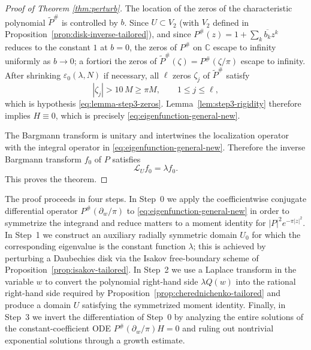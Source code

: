 \documentclass[a4paper,11pt,reqno]{amsart}
\numberwithin{equation}{section}
\theoremstyle{plain} %
\theoremstyle{definition} %
\theoremstyle{remark}
\newcommand{\C}{\mathbb{C}}
\begin{document}
\begin{proof}[Proof of Theorem \ref{thm:perturb}]
The location of the zeros of the characteristic polynomial \(\widetilde P^\#\)
is controlled by \(b\). Since \(U\subset V_2\) (with \(V_2\) defined in
Proposition~\ref{prop:disk-inverse-tailored}), and since
\(P^\#(z)=1+\sum_k\overline{b_k}z^k\) reduces to the constant \(1\) at
\(b=0\), the zeros of \(P^\#\) on \(\C\) escape to infinity uniformly as
\(b\to0\); a fortiori the zeros of \(\widetilde P^\#(\zeta)=P^\#(\zeta/\pi)\)
escape to infinity. After shrinking \(\varepsilon_0(\lambda,N)\) if
necessary, all \(\ell\) zeros \(\zeta_j\) of \(\widetilde P^\#\) satisfy
\[
|\zeta_j|>10\,M\ge\pi M,
\qquad 1\le j\le\ell,
\]
which is hypothesis \eqref{eq:lemma-step3-zeros}. Lemma~\ref{lem:step3-rigidity}
therefore implies $H\equiv 0$, which is precisely
\eqref{eq:eigenfunction-general-new}.

The Bargmann transform is unitary and intertwines the localization operator
with the integral operator in \eqref{eq:eigenfunction-general-new}. Therefore
the inverse Bargmann transform \(f_0\) of \(P\) satisfies
\[
\mathcal L_U f_0=\lambda f_0 .
\]
This proves the theorem.
\end{proof}

\iffalse
The proof proceeds in four steps. In Step~0 we apply the coefficientwise conjugate differential operator $P^\#(\partial_w/\pi)$ to \eqref{eq:eigenfunction-general-new} in order to symmetrize the integrand and reduce matters to a moment identity for $|P|^2 e^{-\pi|z|^2}$. In Step~1 we construct an auxiliary radially symmetric domain $U_0$ for which the corresponding eigenvalue is the constant function $\lambda$; this is achieved by perturbing a Daubechies disk via the Isakov free-boundary scheme of Proposition~\ref{prop:isakov-tailored}. In Step~2 we use a Laplace transform in the variable $w$ to convert the polynomial right-hand side $\lambda Q(w)$ into the rational right-hand side required by Proposition~\ref{prop:cherednichenko-tailored} and produce a domain $U$ satisfying the symmetrized moment identity. Finally, in Step~3 we invert the differentiation of Step~0 by analyzing the entire solutions of the constant-coefficient ODE $P^\#(\partial_w/\pi)H=0$ and ruling out nontrivial exponential solutions through a growth estimate.
\end{document}
